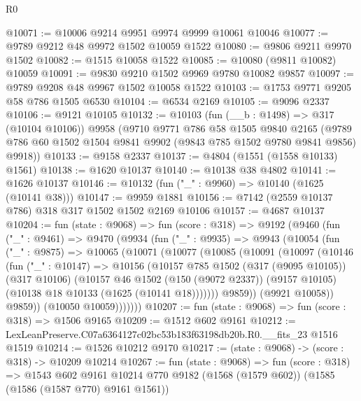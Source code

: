 \begin{lexlean}{R0}
\begin{coremodule}
@10071 := @10006 @9214 @9951 @9974 @9999 @10061 @10046
@10077 := @9789 @9212 @48 @9972 @1502 @10059 @1522
@10080 := @9806 @9211 @9970 @1502
@10082 := @1515 @10058 @1522
@10085 := @10080 (@9811 @10082) @10059
@10091 := @9830 @9210 @1502 @9969 @9780 @10082 @9857
@10097 := @9789 @9208 @48 @9967 @1502 @10058 @1522
@10103 := @1753 @9771 @9205 @58 @786 @1505 @6530
@10104 := @6534 @2169
@10105 := @9096 @2337
@10106 := @9121 @10105
@10132 := @10103
    (fun (__b : @1498) => @317 (@10104 @10106))
    @9958
    (@9710
      @9771
      @786
      @58
      @1505
      @9840
      @2165
      (@9789 @786 @60 @1502 @1504 @9841 @9902 (@9843 @785 @1502 @9780 @9841 @9856) @9918))
@10133 := @9158 @2337
@10137 := @4804 (@1551 (@1558 @10133) @1561)
@10138 := @1620 @10137
@10140 := @10138 @38 @4802
@10141 := @1626 @10137
@10146 := @10132 (fun ("_" : @9960) => @10140 (@1625 (@10141 @38)))
@10147 := @9959 @1881
@10156 := @7142 (@2559 @10137 @786) @318 @317 @1502 @1502 @2169 @10106
@10157 := @4687 @10137
@10204 := fun (state : @9068) =>
  fun (score : @318) =>
  @9192
    (@9460
      (fun ("_" : @9461) =>
      @9470
        (@9934
          (fun ("_" : @9935) =>
          @9943
            (@10054
              (fun ("_" : @9875) =>
              @10065
                (@10071
                  (@10077
                    (@10085
                      (@10091
                        (@10097
                          (@10146
                            (fun ("_" : @10147) =>
                            @10156
                              (@10157
                                @785
                                @1502
                                (@317 (@9095 @10105))
                                (@317 @10106)
                                (@10157
                                  @46
                                  @1502
                                  (@150 (@9072 @2337))
                                  (@9157 @10105)
                                  (@10138 @18 @10133 (@1625 (@10141 @18)))))))
                          @9859))
                      (@9921 @10058))
                    @9859))
                (@10050 @10059)))))))
@10207 := fun (state : @9068) => fun (score : @318) => @1506 @9165
@10209 := @1512 @602 @9161
@10212 := LexLeanPreserve.C07a6364127c02bc53b183f63198db20b.R0.__fits_23 @1516 @1519
@10214 := @1526 @10212 @9170
@10217 := (state : @9068) -> (score : @318) -> @10209 @10214
@10267 := fun (state : @9068) =>
  fun (score : @318) =>
  @1543
    @602
    @9161
    @10214
    @770
    @9182
    (@1568 (@1579 @602))
    (@1585 (@1586 (@1587 @770) @9161 @1561))

\end{coremodule}
\end{lexlean}
